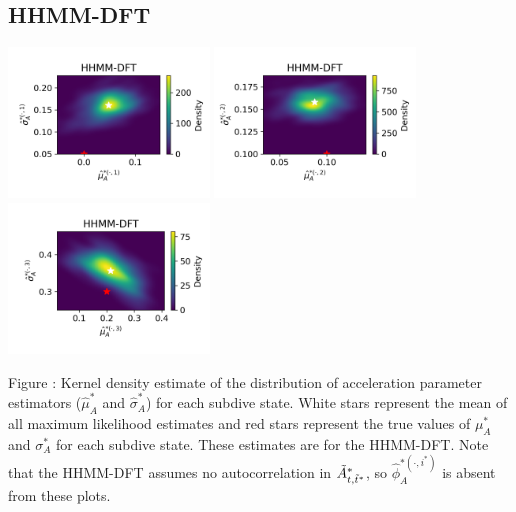\documentclass{article}
\begin{document}
        \subsection{HHMM-DFT}
        \begin{center}
        \includegraphics[width=2.1in]{../Plots/hhmm_FV_uncorr_MLE_density_A_0_0.png}
        \includegraphics[width=2.1in]{../Plots/hhmm_FV_uncorr_MLE_density_A_0_1.png}
        \includegraphics[width=2.1in]{../Plots/hhmm_FV_uncorr_MLE_density_A_0_2.png}
        \end{center}
        
        \noindent Figure : Kernel density estimate of the distribution of acceleration parameter estimators ($\hat \mu^*_A$ and $\hat \sigma^*_A$) for each subdive state. White stars represent the mean of all maximum likelihood estimates and red stars represent the true values of $\mu^*_A$ and $\sigma^*_A$ for each subdive state. These estimates are for the HHMM-DFT. Note that the HHMM-DFT assumes no autocorrelation in $\tilde{A}^*_{t,\tilde t^*}$, so $\hat \phi_A^{*(\cdot,i^*)}$ is absent from these plots.
        \addtocounter{fignum}{1}
        
\end{document}
